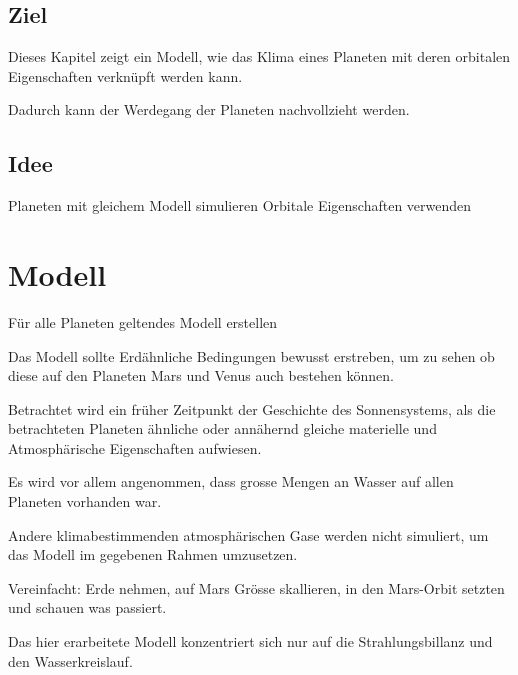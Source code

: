 \begin{refsection}
\subsection{Ziel}
Dieses Kapitel zeigt ein Modell, wie das Klima eines Planeten mit deren orbitalen Eigenschaften verknüpft werden kann.

Dadurch kann der Werdegang der Planeten nachvollzieht werden.

\subsection{Idee}
Planeten mit gleichem Modell simulieren
Orbitale Eigenschaften verwenden


%
%
%

\section{Modell}


	Für alle Planeten geltendes Modell erstellen
	
	Das Modell sollte Erdähnliche Bedingungen bewusst erstreben, um zu sehen ob diese auf den Planeten Mars und Venus auch bestehen können.
	
	Betrachtet wird ein früher Zeitpunkt der Geschichte des Sonnensystems, als die betrachteten Planeten ähnliche oder annähernd gleiche materielle und Atmosphärische Eigenschaften aufwiesen.
	
	Es wird vor allem angenommen, dass grosse Mengen an Wasser auf allen Planeten vorhanden war.
	
	
	Andere klimabestimmenden atmosphärischen Gase werden nicht simuliert, um das Modell im gegebenen Rahmen umzusetzen.

	
	Vereinfacht: Erde nehmen, auf Mars Grösse skallieren, in den Mars-Orbit setzten und schauen was passiert. 
	

Das hier erarbeitete Modell konzentriert sich nur auf die Strahlungsbillanz und den Wasserkreislauf.


\end{refsection}
